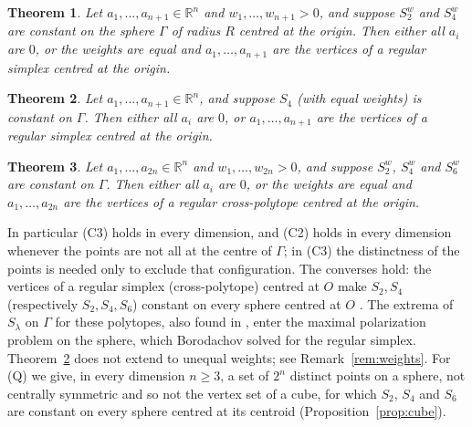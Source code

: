 \documentclass[11pt]{article}
\newtheorem{theorem}{Theorem}
\theoremstyle{remark}
\begin{document}
\begin{theorem}\label{thm:simplex}
Let $a_1,\dots,a_{n+1}\in\mathbb{R}^n$ and $w_1,\dots,w_{n+1}>0$, and suppose $S^w_2$ and $S^w_4$ are constant on the sphere $\Gamma$ of radius $R$ centred at the origin. Then either all $a_i$ are $0$, or the weights are equal and $a_1,\dots,a_{n+1}$ are the vertices of a regular simplex centred at the origin.
\end{theorem}

\begin{theorem}\label{thm:fourth}
Let $a_1,\dots,a_{n+1}\in\mathbb{R}^n$, and suppose $S_4$ (with equal weights) is constant on $\Gamma$. Then either all $a_i$ are $0$, or $a_1,\dots,a_{n+1}$ are the vertices of a regular simplex centred at the origin.
\end{theorem}

\begin{theorem}\label{thm:cross}
Let $a_1,\dots,a_{2n}\in\mathbb{R}^n$ and $w_1,\dots,w_{2n}>0$, and suppose $S^w_2$, $S^w_4$ and $S^w_6$ are constant on $\Gamma$. Then either all $a_i$ are $0$, or the weights are equal and $a_1,\dots,a_{2n}$ are the vertices of a regular cross-polytope centred at the origin.
\end{theorem}

In particular (C3) holds in every dimension, and (C2) holds in every dimension whenever the points are not all at the centre of $\Gamma$; in (C3) the distinctness of the points is needed only to exclude that configuration. The converses hold: the vertices of a regular simplex (cross-polytope) centred at $O$ make $S_2,S_4$ (respectively $S_2,S_4,S_6$) constant on every sphere centred at $O$ \cite{NR}. The extrema of $S_\lambda$ on $\Gamma$ for these polytopes, also found in \cite{NR}, enter the maximal polarization problem on the sphere, which Borodachov \cite{Borodachov} solved for the regular simplex. Theorem~\ref{thm:fourth} does not extend to unequal weights; see Remark~\ref{rem:weights}. For (Q) we give, in every dimension $n\ge3$, a set of $2^n$ distinct points on a sphere, not centrally symmetric and so not the vertex set of a cube, for which $S_2$, $S_4$ and $S_6$ are constant on every sphere centred at its centroid (Proposition~\ref{prop:cube}).
\end{document}
